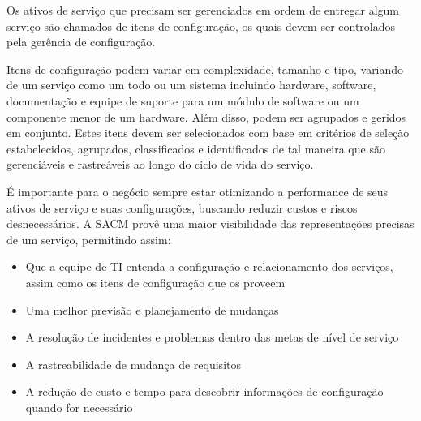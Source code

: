 Os ativos de serviço que precisam ser gerenciados em ordem de entregar algum serviço são chamados de itens de configuração, os quais devem ser controlados pela gerência de configuração.

Itens de configuração podem variar em complexidade, tamanho e tipo, variando de um serviço como um todo ou um sistema incluindo hardware, software, documentação e equipe de suporte para um módulo de software ou um componente menor de um hardware. Além disso, podem ser agrupados e geridos em conjunto. Estes itens devem ser selecionados com base em critérios de seleção estabelecidos, agrupados, classificados e identificados de tal maneira que são gerenciáveis e rastreáveis ao longo do ciclo de vida do serviço.

É importante para o negócio sempre estar otimizando a performance de seus ativos de serviço e suas configurações, buscando reduzir custos e riscos desnecessários. A SACM provê uma maior visibilidade das representações precisas de um serviço, permitindo assim:

\begin{itemize}
\item Que a equipe de TI entenda a configuração e relacionamento dos serviços, assim como os itens de configuração que os proveem
\item Uma melhor previsão e planejamento de mudanças
\item A resolução de incidentes e problemas dentro das metas de nível de serviço
\item A rastreabilidade de mudança de requisitos
\item A redução de custo e tempo para descobrir informações de configuração quando for necessário
\end{itemize}
